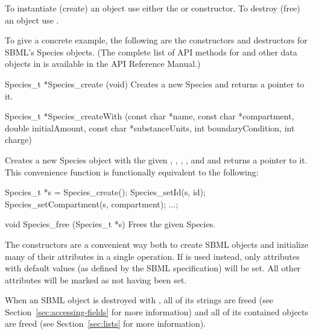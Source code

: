 \documentclass{sbmlmanual}
\begin{document}
To instantiate (create) an object use either the
 or  constructor.  To
destroy (free) an object use .

To give a concrete example, the following are the constructors and
destructors for SBML's Species objects.  (The complete list of API methods
for  and other data objects in \libsbml{} is available in
the \libsbml{} API Reference Manual.)


\begin{methoddef}{Species\_t *Species\_create (void)}
  Creates a new Species and returns a pointer to it.
\end{methoddef}

\begin{methoddef}{Species\_t *Species\_createWith (const char *name,
    const char *compartment,\\ double initialAmount, const char *substanceUnits,
    int boundaryCondition, int charge)}
  
  Creates a new Species object with the given ,
  , ,
  ,  and
   and returns a pointer to it.  This convenience function
  is functionally equivalent to the following:
  \begin{cVerbatim}
Species_t *s = Species_create();
Species_setId(s, id); Species_setCompartment(s, compartment); ...;
  \end{cVerbatim}
\end{methoddef}

\begin{methoddef}{void Species\_free (Species\_t *s)}
  Frees the given Species.
\end{methoddef}


The  constructors are a convenient way both to
create SBML objects and initialize many of their attributes in a single
operation.  If  is used instead, only attributes with
default values (as defined by the SBML specification) will be set.  All
other attributes will be marked as not having been set.

When an SBML object is destroyed with , all of its
strings are freed (see Section~\ref{sec:accessing-fields} for more
information) and all of its contained objects are freed (see
Section~\ref{sec:lists} for more information).


\end{document}
